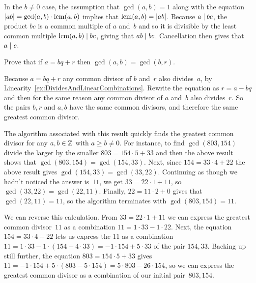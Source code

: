 \documentclass{ibl}  %
\begin{document}
\begin{euclidproof}
\begin{problem}
\begin{exes}
\begin{answer}
  In the $b\neq 0$ case, the assumption that $\gcd(a,b)=1$ 
  along with the equation $\lvert ab\rvert=\gcd(a,b)\cdot\operatorname{lcm}(a,b)$ implies that 
  $\operatorname{lcm}(a,b)=\lvert ab\rvert$.
  Because $a\mid bc$, the product $bc$ is a common 
  multiple of $a$ and~$b$ and so it is divisible by the least common multiple
  $\operatorname{lcm}(a,b)\mid bc$, giving that $ab\mid bc$.  
  Cancellation then gives that $a\mid c$.  
\end{answer}
\end{exes}
\end{problem}
\end{euclidproof}


\begin{bezoutproof}
\begin{problem}
Prove that if $a=bq+r$ then $\gcd(a,b)=\gcd(b,r)$.  
\begin{answer}
Because $a=bq+r$ any common divisor of $b$ and~$r$ also divides~$a$, 
by Linearity~\ref{ex:DividesAndLinearCombinations}.
Rewrite the equation as $r=a-bq$ and then for the same reason any
common divisor of $a$ and~$b$ also divides~$r$.
So the pairs $b,r$ and $a,b$ have the same common divisors, and
therefore the same greatest common divisor.
\end{answer}
\end{problem}

The algorithm associated with this result quickly finds the greatest common
divisor for any $a,b\in\mathbb{Z}$ with $a\geq b\neq 0$.  
For instance, to find $\gcd(803,154)$ divide the larger by
the smaller $803=154\cdot 5+33$ and then the above result shows that  
$\gcd(803,154)=\gcd(154,33)$.
Next, since $154=33\cdot 4+22$ the above result gives
$\gcd(154,33)=\gcd(33,22)$.
Continuing as though we hadn't noticed the answer is~$11$,
we get $33=22\cdot 1+11$, so $\gcd(33,22)=\gcd(22,11)$.
Finally, $22=11\cdot 2+0$ gives that 
$\gcd(22,11)=11$, so the algorithm terminates with $\gcd(803,154)=11$.

We can reverse this calculation.
From $33=22\cdot 1+11$ we can  
express the greatest common divisor~$11$ as a combination 
$11=1\cdot 33-1\cdot 22$.
Next, 
the equation $154=33\cdot 4+22$ lets us express
the $11$ as a combination 
$11=1\cdot 33-1\cdot (154-4\cdot 33)=-1\cdot 154+5\cdot 33$
of the pair $154,33$.
Backing up still further, the equation 
$803=154\cdot 5+33$
gives $11=-1\cdot 154+5\cdot (803-5\cdot 154)=5\cdot 803-26\cdot 154$, so 
we can express the greatest common divisor as a combination of our
initial pair~$803,154$.



\end{bezoutproof}
\end{document}
